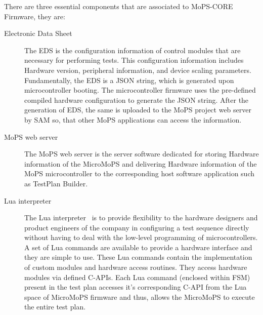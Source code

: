 



There are three essential components that are associated to MoPS-CORE Firmware, they are: 

\begin{description}
	\item[Electronic Data Sheet] The \gls{EDS} is the configuration information of control modules that are necessary for performing tests.
	This configuration information includes Hardware version, peripheral information, and device scaling parameters.
	 Fundamentally, the EDS is a JSON string, which is generated upon microcontroller booting. 
	 The microcontroller firmware uses the pre-defined compiled hardware configuration to generate the JSON string. 
	 After the generation of \gls{EDS}, the same is uploaded to the MoPS project web server by SAM so, that other MoPS applications can access the information. 
	
	\item[MoPS web server] The MoPS web server is the server software dedicated for storing Hardware information of the MicroMoPS and delivering Hardware information of the MoPS microcontroller to the corresponding host software application such as TestPlan Builder. 
	 
	\item[Lua interpreter] The Lua interpreter~\cite{Ierusalimschy1996a,Steinwender2015} is to provide flexibility to the hardware designers and product engineers of the company in configuring a test sequence directly without having to deal with the low-level programming of microcontrollers. 
	A set of Lua commands are available to provide a hardware interface and they are simple to use. 
	These Lua commands contain the implementation of custom modules and hardware access routines. 
	They access hardware modules via defined C-APIs. Each Lua command (enclosed within FSM) present in the test plan accesses it's corresponding C-\gls{API} from the Lua space of MicroMoPS firmware and thus, allows the MicroMoPS to execute the entire test plan.
\end{description}



